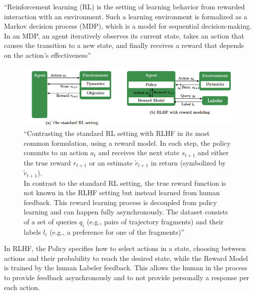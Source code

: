 \documentclass[12pt]{article}
\begin{document}
``Reinforcement learning (RL)\cite{ReinforcementLearningAnIntroduction} is the setting of learning behavior from rewarded interaction with an environment. Such a learning environment is formalized as a Markov decision process (MDP), which is a model for sequential decision-making. In an MDP, an agent iteratively observes its current state, takes an action that causes the transition to a new state, and finally receives a reward that depends on the action’s effectiveness''\cite{kaufmann2024surveyreinforcementlearninghuman}
    \begin{figure}[H]
    \centering
            \includegraphics[width=1\textwidth]{RL_and_RLHF.png}
    \caption[reward models in RL and RLHF]{``Contrasting the standard RL setting with RLHF in its most common formulation, using a reward model. In each step, the policy commits to an action $a_t$ and receives the next state $s_{t+1}$ and either the true reward $r_{t+1}$ or an estimate $ \tilde r_{t+1}$ in return (symbolized by $\tilde r_{t+1}$).\\ In contrast to the standard RL setting, the true reward function is not known in the RLHF setting but instead learned from human feedback. This reward learning process is decoupled from policy learning and can happen fully asynchronously. The dataset consists of a set of queries $q_i$ (e.g., pairs of trajectory fragments) and their labels $l_i$ (e.g., a preference for one of the fragments)''\cite{kaufmann2024surveyreinforcementlearninghuman}}
    \end{figure}
\noindent In RLHF, the Policy specifies how to select actions in a state, choosing between actions and their probability to reach the desired state, while the Reward Model is trained by the human Labeler feedback. This allows the human in the process to provide feedback asynchronously and to not provide personally a response per each action.\cite{kaufmann2024surveyreinforcementlearninghuman}\\

    
\end{document}

